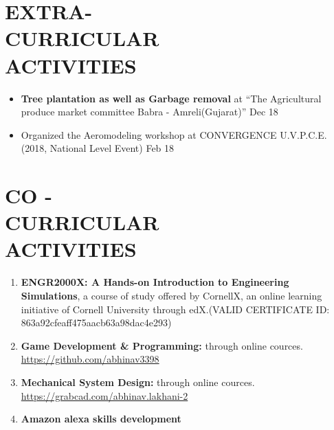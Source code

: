 \documentclass[margin]{res}
\begin{document}
    \section{EXTRA- \\ CURRICULAR \\ ACTIVITIES}
    \begin{itemize}
    \item \textbf{Tree plantation as well as Garbage removal} at “The Agricultural produce market committee Babra - Amreli(Gujarat)” \hfill{Dec 18}
    \item Organized the Aeromodeling workshop at CONVERGENCE U.V.P.C.E.(2018, National Level Event) \hfill{Feb 18}
    \end{itemize}
  
    \section{CO - \\ CURRICULAR \\ ACTIVITIES}
    \begin{enumerate}   
    \item \textbf{ENGR2000X: A Hands-on Introduction to Engineering Simulations}, a course of study offered by CornellX, an online learning initiative of Cornell University through edX.(VALID CERTIFICATE ID: 863a92cfeaff475aacb63a98dac4e293)
    \item \textbf{Game Development \& Programming: } through online cources.\\ \href{https://github.com/abhinav3398}{https://github.com/abhinav3398}
    \item \textbf{Mechanical System Design: } through online cources.\\ \href{https://grabcad.com/abhinav.lakhani-2}{https://grabcad.com/abhinav.lakhani-2}
    \item \textbf{Amazon alexa skills development }
    \end{enumerate}
\end{document}
